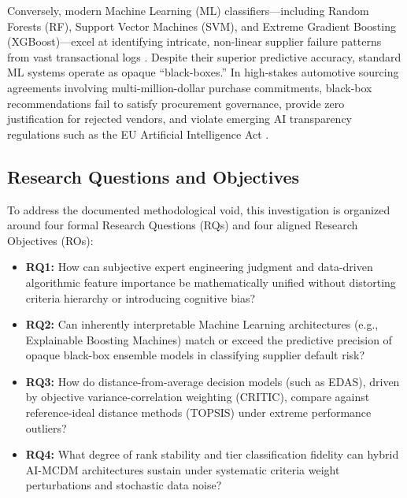 \documentclass[twocolumn,10pt]{article}
\begin{document}
Conversely, modern Machine Learning (ML) classifiers—including Random Forests (RF), Support Vector Machines (SVM), and Extreme Gradient Boosting (XGBoost)—excel at identifying intricate, non-linear supplier failure patterns from vast transactional logs \cite{gupta2021machine, sethi2023predictive}. Despite their superior predictive accuracy, standard ML systems operate as opaque ``black-boxes.'' In high-stakes automotive sourcing agreements involving multi-million-dollar purchase commitments, black-box recommendations fail to satisfy procurement governance, provide zero justification for rejected vendors, and violate emerging AI transparency regulations such as the EU Artificial Intelligence Act \cite{arrieta2020explainable}.

\subsection{Research Questions and Objectives}
\label{subsec:rq_ro}

To address the documented methodological void, this investigation is organized around four formal Research Questions (RQs) and four aligned Research Objectives (ROs):

\begin{itemize}
    \item \textbf{RQ1:} How can subjective expert engineering judgment and data-driven algorithmic feature importance be mathematically unified without distorting criteria hierarchy or introducing cognitive bias?
    \item \textbf{RQ2:} Can inherently interpretable Machine Learning architectures (e.g., Explainable Boosting Machines) match or exceed the predictive precision of opaque black-box ensemble models in classifying supplier default risk?
    \item \textbf{RQ3:} How do distance-from-average decision models (such as EDAS), driven by objective variance-correlation weighting (CRITIC), compare against reference-ideal distance methods (TOPSIS) under extreme performance outliers?
    \item \textbf{RQ4:} What degree of rank stability and tier classification fidelity can hybrid AI-MCDM architectures sustain under systematic criteria weight perturbations and stochastic data noise?
\end{itemize}
\end{document}
